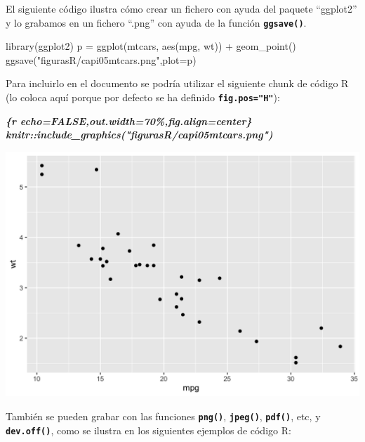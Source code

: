 \documentclass[12pt,a4paper,oneside,]{book}
\newenvironment{Shaded}{\begin{snugshade}}{\end{snugshade}}
\newcommand{\AttributeTok}[1]{\textcolor[rgb]{0.77,0.63,0.00}{#1}}
\newcommand{\FunctionTok}[1]{\textcolor[rgb]{0.00,0.00,0.00}{#1}}
\newcommand{\InformationTok}[1]{\textcolor[rgb]{0.56,0.35,0.01}{\textbf{\textit{#1}}}}
\newcommand{\NormalTok}[1]{#1}
\newcommand{\OtherTok}[1]{\textcolor[rgb]{0.56,0.35,0.01}{#1}}
\newcommand{\SpecialCharTok}[1]{\textcolor[rgb]{0.00,0.00,0.00}{#1}}
\newcommand{\StringTok}[1]{\textcolor[rgb]{0.31,0.60,0.02}{#1}}
\numberwithin{dummy}{section}
\theoremstyle{ocrenumbox}
\theoremstyle{blacknumex}
\theoremstyle{blacknumbox}
\theoremstyle{ocrenum}
\theoremstyle{ocrenum}
\begin{document}
El siguiente código ilustra cómo crear un fichero con ayuda del paquete
``ggplot2'' y lo grabamos en un fichero ``.png'' con ayuda de la función
\textbf{\texttt{ggsave()}}.

\begin{Shaded}
\begin{Highlighting}[]
\FunctionTok{library}\NormalTok{(ggplot2)}
\NormalTok{p }\OtherTok{=} \FunctionTok{ggplot}\NormalTok{(mtcars, }\FunctionTok{aes}\NormalTok{(mpg, wt)) }\SpecialCharTok{+} 
  \FunctionTok{geom\_point}\NormalTok{()}
\FunctionTok{ggsave}\NormalTok{(}\StringTok{"figurasR/capi05mtcars.png"}\NormalTok{,}\AttributeTok{plot=}\NormalTok{p)}
\end{Highlighting}
\end{Shaded}

Para incluirlo en el documento se podría utilizar el siguiente chunk de
código R (lo coloca aquí porque por defecto se ha definido
\textbf{\texttt{fig.pos="H"}}):

\begin{Shaded}
\begin{Highlighting}[]
\InformationTok{\textasciigrave{}\textasciigrave{}\textasciigrave{}\{r echo=FALSE,out.width=\textquotesingle{}70\%\textquotesingle{},fig.align=\textquotesingle{}center\textquotesingle{}\}}
\InformationTok{knitr::include\_graphics("figurasR/capi05mtcars.png")}
\InformationTok{\textasciigrave{}\textasciigrave{}\textasciigrave{}}
\end{Highlighting}
\end{Shaded}

\begin{center}\includegraphics[width=0.7\linewidth]{figurasR/capi05mtcars} \end{center}

También se pueden grabar con las funciones \textbf{\texttt{png()}},
\textbf{\texttt{jpeg()}}, \textbf{\texttt{pdf()}}, etc, y
\textbf{\texttt{dev.off()}}, como se ilustra en los siguientes ejemplos
de código R:
\end{document}
